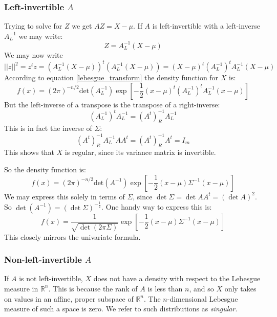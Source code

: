 \documentclass[12pt, a4paper]{article}
\numberwithin{equation}{section}
\begin{document}
\subsubsection{Left-invertible $A$}
Trying to solve for $Z$ we get $AZ=X-\mu$. If $A$ is left-invertible with a left-inverse $A^{-1}_L$ we may write:
\begin{equation}
Z=A^{-1}_L(X-\mu)
\end{equation}
We may now write
\begin{equation}
||z||^2=z^t z=\left(A^{-1}_L(X-\mu)\right)^t\left(A^{-1}_L(X-\mu)\right)=(X-\mu)^t\left(A^{-1}_L\right)^t A^{-1}_L(X-\mu)
\end{equation}
According to equation \ref{lebesgue_transform} the density function for $X$ is:
\begin{equation}
f(x)=(2\pi)^{-n/2}\textrm{det}(A^{-1}_L)\exp\left[-\frac{1}{2}(x-\mu)^t\left(A^{-1}_L\right)^t A^{-1}_L(x-\mu)\right]
\end{equation}
But the left-inverse of a transpose is the transpose of a right-inverse:
\begin{equation}
\left(A^{-1}_L\right)^t A^{-1}_L=(A^t)^{-1}_R A^{-1}_L
\end{equation}
This is in fact the inverse of $\Sigma$:
\begin{equation}
(A^t)^{-1}_R A^{-1}_L AA^t=(A^t)^{-1}_R A^t=I_m
\end{equation}
This shows that $X$ is regular, since its variance matrix is invertible.

So the density function is:
\begin{equation}
f(x)=(2\pi)^{-n/2}\textrm{det}(A^{-1})\exp\left[-\frac{1}{2}(x-\mu)\Sigma^{-1}(x-\mu)\right]
\end{equation}
We may express this solely in terms of $\Sigma$, since $\det\Sigma=\det AA^t=(\det A)^2$. So $\det(A^{-1})=(\det\Sigma)^{-\frac{1}{2}}$. One handy way to express this is:
\begin{equation}
\label{mvn_density}
f(x)=\frac{1}{\sqrt{\det(2\pi\Sigma)}}\exp\left[-\frac{1}{2}(x-\mu)\Sigma^{-1}(x-\mu)\right]
\end{equation}
This closely mirrors the univariate formula.

\subsubsection{Non-left-invertible $A$}
If $A$ is not left-invertible, $X$ does not have a density with respect to the Lebesgue measure in $\mathbb{R}^n$. This is because the rank of $A$ is less than $n$, and so $X$ only takes on values in an affine, proper subspace of $\mathbb{R}^n$. The $n$-dimensional Lebesgue measure of such a space is zero. We refer to such distributions as \textit{singular}.
\end{document}
